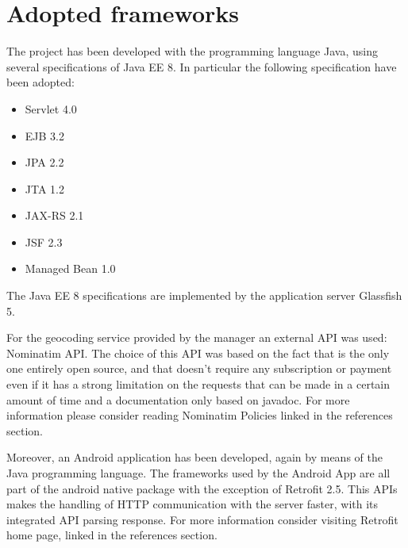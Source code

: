 
\section{Adopted frameworks}

The project has been developed with the programming language Java, using several specifications of Java EE 8.
In particular the following specification have been adopted:

\begin{itemize}
\item Servlet 4.0
\item EJB 3.2
\item JPA 2.2
\item JTA 1.2
\item JAX-RS 2.1
\item JSF 2.3
\item Managed Bean 1.0
\end{itemize}
The Java EE 8 specifications are implemented by the application server Glassfish 5.
\vspace{1em}

\noindent
For the geocoding service provided by the manager an external API was used: Nominatim API. 
The choice of this API was based on the fact that is the only one entirely open source, and that doesn't require any subscription or payment even if it has a strong limitation on the requests that can be made in a certain amount of time and a documentation only based on javadoc.
For more information please consider reading Nominatim Policies linked in the references section.
\vspace{1em}

\noindent
Moreover, an Android application has been developed, again by means of the Java programming language.
The frameworks used by the Android App are all part of the android native package with the exception of Retrofit 2.5. This APIs makes the handling of HTTP communication with the server faster, with its integrated API parsing response. 
For more information consider visiting Retrofit home page, linked in the references section.
